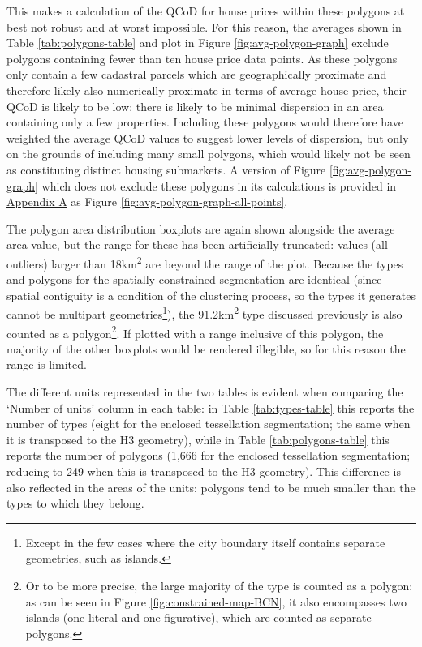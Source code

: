 \documentclass[a4paper, nobind]{templates/ociamthesis}
\begin{document}
This makes a calculation of the QCoD for house prices within these polygons at best not robust and at worst impossible. For this reason, the averages shown in Table \ref{tab:polygons-table} and plot in Figure \ref{fig:avg-polygon-graph} exclude polygons containing fewer than ten house price data points. As these polygons only contain a few cadastral parcels which are geographically proximate and therefore likely also numerically proximate in terms of average house price, their QCoD is likely to be low: there is likely to be minimal dispersion in an area containing only a few properties. Including these polygons would therefore have weighted the average QCoD values to suggest lower levels of dispersion, but only on the grounds of including many small polygons, which would likely not be seen as constituting distinct housing submarkets. A version of Figure \ref{fig:avg-polygon-graph} which does not exclude these polygons in its calculations is provided in \protect\hyperlink{additional-figures}{Appendix A} as Figure \ref{fig:avg-polygon-graph-all-points}.

The polygon area distribution boxplots are again shown alongside the average area value, but the range for these has been artificially truncated: values (all outliers) larger than 18km\textsuperscript{2} are beyond the range of the plot. Because the types and polygons for the spatially constrained segmentation are identical (since spatial contiguity is a condition of the clustering process, so the types it generates cannot be multipart geometries\footnote{Except in the few cases where the city boundary itself contains separate geometries, such as islands.}), the 91.2km\textsuperscript{2} type discussed previously is also counted as a polygon\footnote{Or to be more precise, the large majority of the type is counted as a polygon: as can be seen in Figure \ref{fig:constrained-map-BCN}, it also encompasses two islands (one literal and one figurative), which are counted as separate polygons.}. If plotted with a range inclusive of this polygon, the majority of the other boxplots would be rendered illegible, so for this reason the range is limited.

The different units represented in the two tables is evident when comparing the `Number of units' column in each table: in Table \ref{tab:types-table} this reports the number of types (eight for the enclosed tessellation segmentation; the same when it is transposed to the H3 geometry), while in Table \ref{tab:polygons-table} this reports the number of polygons (1,666 for the enclosed tessellation segmentation; reducing to 249 when this is transposed to the H3 geometry). This difference is also reflected in the areas of the units: polygons tend to be much smaller than the types to which they belong.
\end{document}
